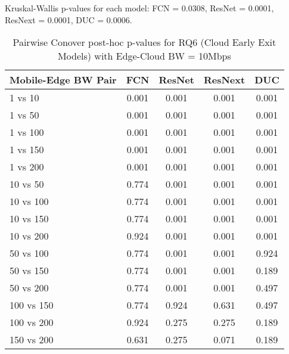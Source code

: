 \begin{table}[h]
\centering
\caption{Pairwise Conover post-hoc p-values for RQ6 (Cloud Early Exit Models) with Edge-Cloud BW = 10Mbps}
\label{tab:conover_cloud_earlyexit_ec10}
\smallskip
Kruskal-Wallis p-values for each model: FCN = 0.0308, ResNet = 0.0001, ResNext = 0.0001, DUC = 0.0006.

\begin{tabular}{lcccc}
\toprule
Mobile-Edge BW Pair & FCN & ResNet & ResNext & DUC \\
\midrule
1 vs 10 & 0.001 & 0.001 & 0.001 & 0.001 \\
1 vs 50 & 0.001 & 0.001 & 0.001 & 0.001 \\
1 vs 100 & 0.001 & 0.001 & 0.001 & 0.001 \\
1 vs 150 & 0.001 & 0.001 & 0.001 & 0.001 \\
1 vs 200 & 0.001 & 0.001 & 0.001 & 0.001 \\
10 vs 50 & 0.774 & 0.001 & 0.001 & 0.001 \\
10 vs 100 & 0.774 & 0.001 & 0.001 & 0.001 \\
10 vs 150 & 0.774 & 0.001 & 0.001 & 0.001 \\
10 vs 200 & 0.924 & 0.001 & 0.001 & 0.001 \\
50 vs 100 & 0.774 & 0.001 & 0.001 & 0.924 \\
50 vs 150 & 0.774 & 0.001 & 0.001 & 0.189 \\
50 vs 200 & 0.774 & 0.001 & 0.001 & 0.497 \\
100 vs 150 & 0.774 & 0.924 & 0.631 & 0.497 \\
100 vs 200 & 0.924 & 0.275 & 0.275 & 0.189 \\
150 vs 200 & 0.631 & 0.275 & 0.071 & 0.189 \\
\bottomrule
\end{tabular}
\end{table}

